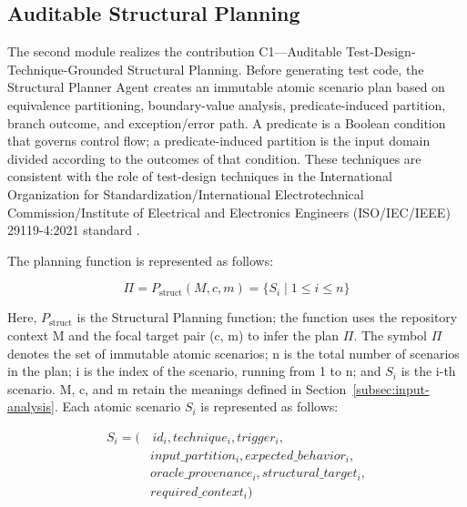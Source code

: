 \documentclass[pdflatex,sn-basic,Numbered,iicol]{sn-jnl}
\begin{document}
\subsection{Auditable Structural Planning}\label{subsec:structural-planning}

The second module realizes the contribution C1---Auditable Test-Design-Technique-Grounded Structural Planning. Before generating test code, the Structural Planner Agent creates an immutable atomic scenario plan based on equivalence partitioning, boundary-value analysis, predicate-induced partition, branch outcome, and exception/error path. A predicate is a Boolean condition that governs control flow; a predicate-induced partition is the input domain divided according to the outcomes of that condition. These techniques are consistent with the role of test-design techniques in the International Organization for Standardization/International Electrotechnical Commission/Institute of Electrical and Electronics Engineers (ISO/IEC/IEEE) 29119-4:2021 standard \cite{bib30}.

The planning function is represented as follows:

\begin{equation}
\Pi = P_{\mathrm{struct}}(M,c,m) = \{S_i \mid 1 \leq i \leq n\}
\label{eq:structural-plan}
\end{equation}

Here, $P_{\mathrm{struct}}$ is the Structural Planning function; the function uses the repository context M and the focal target pair (c, m) to infer the plan \ensuremath{\Pi}. The symbol \ensuremath{\Pi} denotes the set of immutable atomic scenarios; n is the total number of scenarios in the plan; i is the index of the scenario, running from 1 to n; and $S_i$ is the i-th scenario. M, c, and m retain the meanings defined in Section~\ref{subsec:input-analysis}. Each atomic scenario $S_i$ is represented as follows:

\begin{equation}
\begin{aligned}
S_i = (&\,id_i, technique_i, trigger_i,\\
&input\_partition_i, expected\_behavior_i,\\
&oracle\_provenance_i, structural\_target_i,\\
&required\_context_i)
\end{aligned}
\label{eq:atomic-scenario}
\end{equation}
\end{document}
